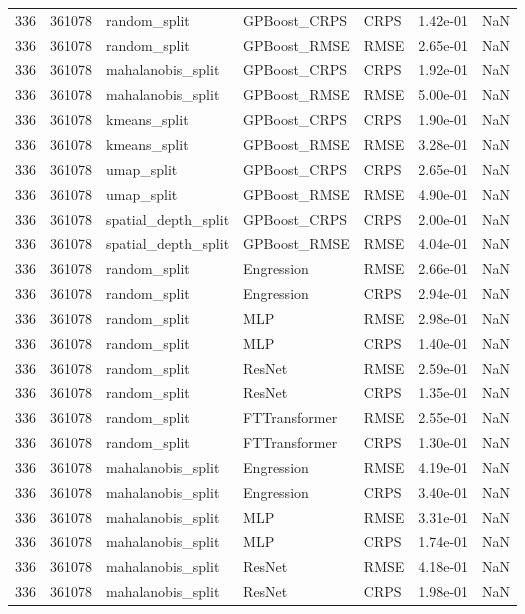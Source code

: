 \begin{tabular}{rrlllrr}
336 & 361078 & random\_split & GPBoost\_CRPS & CRPS & 1.42e-01 & NaN \\
336 & 361078 & random\_split & GPBoost\_RMSE & RMSE & 2.65e-01 & NaN \\
336 & 361078 & mahalanobis\_split & GPBoost\_CRPS & CRPS & 1.92e-01 & NaN \\
336 & 361078 & mahalanobis\_split & GPBoost\_RMSE & RMSE & 5.00e-01 & NaN \\
336 & 361078 & kmeans\_split & GPBoost\_CRPS & CRPS & 1.90e-01 & NaN \\
336 & 361078 & kmeans\_split & GPBoost\_RMSE & RMSE & 3.28e-01 & NaN \\
336 & 361078 & umap\_split & GPBoost\_CRPS & CRPS & 2.65e-01 & NaN \\
336 & 361078 & umap\_split & GPBoost\_RMSE & RMSE & 4.90e-01 & NaN \\
336 & 361078 & spatial\_depth\_split & GPBoost\_CRPS & CRPS & 2.00e-01 & NaN \\
336 & 361078 & spatial\_depth\_split & GPBoost\_RMSE & RMSE & 4.04e-01 & NaN \\
336 & 361078 & random\_split & Engression & RMSE & 2.66e-01 & NaN \\
336 & 361078 & random\_split & Engression & CRPS & 2.94e-01 & NaN \\
336 & 361078 & random\_split & MLP & RMSE & 2.98e-01 & NaN \\
336 & 361078 & random\_split & MLP & CRPS & 1.40e-01 & NaN \\
336 & 361078 & random\_split & ResNet & RMSE & 2.59e-01 & NaN \\
336 & 361078 & random\_split & ResNet & CRPS & 1.35e-01 & NaN \\
336 & 361078 & random\_split & FTTransformer & RMSE & 2.55e-01 & NaN \\
336 & 361078 & random\_split & FTTransformer & CRPS & 1.30e-01 & NaN \\
336 & 361078 & mahalanobis\_split & Engression & RMSE & 4.19e-01 & NaN \\
336 & 361078 & mahalanobis\_split & Engression & CRPS & 3.40e-01 & NaN \\
336 & 361078 & mahalanobis\_split & MLP & RMSE & 3.31e-01 & NaN \\
336 & 361078 & mahalanobis\_split & MLP & CRPS & 1.74e-01 & NaN \\
336 & 361078 & mahalanobis\_split & ResNet & RMSE & 4.18e-01 & NaN \\
336 & 361078 & mahalanobis\_split & ResNet & CRPS & 1.98e-01 & NaN \\

\end{tabular}
